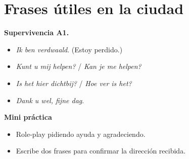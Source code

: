 \section{Frases útiles en la ciudad}
\textbf{Supervivencia A1.}
\begin{itemize}[leftmargin=*]
  \item \textit{Ik ben verdwaald}. (Estoy perdido.)
  \item \textit{Kunt u mij helpen?} / \textit{Kan je me helpen?}
  \item \textit{Is het hier dichtbij?} / \textit{Hoe ver is het?}
  \item \textit{Dank u wel, fijne dag}.
\end{itemize}

\textbf{Mini práctica}
\begin{itemize}[leftmargin=*]
  \item Role-play pidiendo ayuda y agradeciendo.
  \item Escribe dos frases para confirmar la dirección recibida.
\end{itemize}
